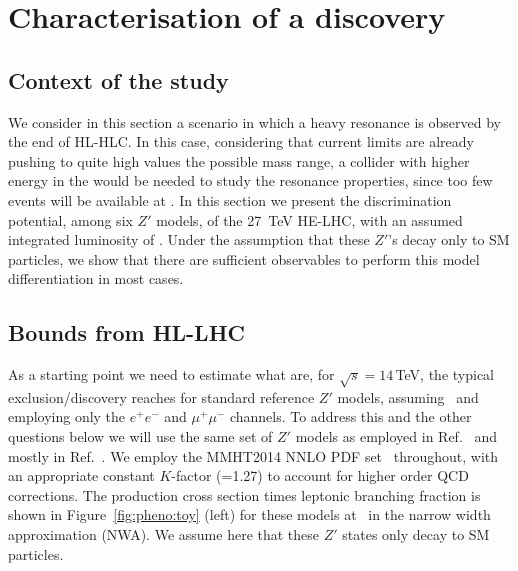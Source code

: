 \section{Characterisation of a \texorpdfstring{\Zp}{zp} discovery}
\label{sec:zprimedisc}

\subsection{Context of the study}
We consider in this section a scenario in which a heavy resonance is observed by the end of HL-HLC. In this case, considering that current limits are already pushing to quite high values the possible mass range, a collider with higher energy
in the \com would be needed to study the resonance properties, since too few events will be available at \sqrtslhc. In this section we present the discrimination potential, among six $Z'$ models, of the 27~TeV HE-LHC, with an assumed integrated luminosity of \intlumihelhc. Under the assumption that these $Z'$'s decay only to SM particles, we show that there are sufficient observables to perform this model differentiation in most cases.

\subsection{Bounds from HL-LHC}
As a starting point we need to estimate what are, for $\sqrt s=14$\,TeV, the typical exclusion/discovery reaches for standard reference $Z'$ models, assuming \intlumihllhc\ and employing only the $e^+e^-$ and $\mu^+\mu^-$ channels. To address this and the other questions below we will use the same set of $Z'$ models as employed
in Ref.~\cite{Rizzo:2014xma} and mostly in Ref.~\cite{Han:2013mra}. We employ the MMHT2014 NNLO PDF set~\cite{Harland-Lang:2014zoa}
throughout, with an appropriate constant $K$-factor (=1.27) to account for higher order QCD corrections. The production cross section times leptonic branching fraction is shown in Figure~\ref{fig:pheno:toy} (left) for these models at \sqrtslhc\ in the narrow width approximation (NWA). We assume here that these $Z'$ states only decay to SM particles.


